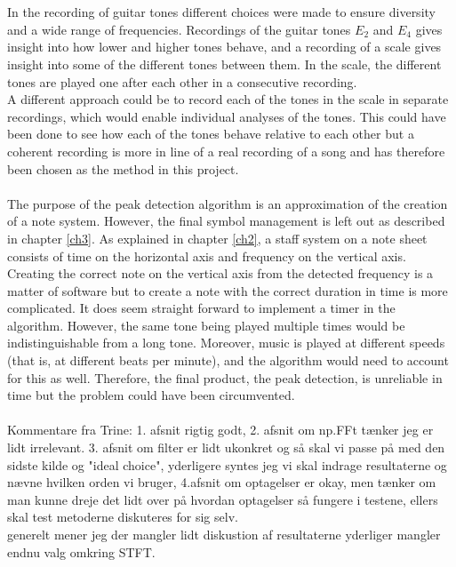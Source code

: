 \\ \\
In the recording of guitar tones different choices were made to ensure diversity and a wide range of frequencies.
Recordings of the guitar tones $E_2$ and $E_4$ gives insight into how lower and higher tones behave, and a recording of a scale gives insight into some of the different tones between them. In the scale, the different tones are played one after each other in a consecutive recording. \\
A different approach could be to record each of the tones in the scale in separate recordings, which would enable individual analyses of the tones. This could have been done to see how each of the tones behave relative to each other but a coherent recording is more in line of a real recording of a song and has therefore been chosen as the method in this project.
\\ \\
The purpose of the peak detection algorithm is an approximation  of the creation of a note system. However, the final symbol management is left out as described in chapter \ref{ch3}. As explained in chapter \ref{ch2}, a staff system on a note sheet consists of time on the horizontal axis and frequency on the vertical axis. Creating the correct note on the vertical axis from the detected frequency is a matter of software but to create a note with the correct duration in time is more complicated. It does seem straight forward to implement a timer in the algorithm. However, the same tone being played multiple times would be indistinguishable from a long tone. Moreover, music is played at different speeds (that is, at different beats per minute), and the algorithm would need to account for this as well. Therefore, the final product, the peak detection, is unreliable in time but the problem could have been circumvented.
\\ \\
Kommentare fra Trine: 1. afsnit rigtig godt, 2. afsnit om np.FFt tænker jeg er lidt irrelevant. 3. afsnit om filter er lidt ukonkret og så skal vi passe på med den sidste kilde og "ideal choice", yderligere syntes jeg vi skal indrage resultaterne og nævne hvilken orden vi bruger, 4.afsnit om optagelser er okay, men tænker om man kunne dreje det lidt over på hvordan optagelser så fungere i testene, ellers skal test metoderne diskuteres for sig selv. \\
generelt mener jeg der mangler lidt diskustion af resultaterne yderliger mangler endnu valg omkring STFT.